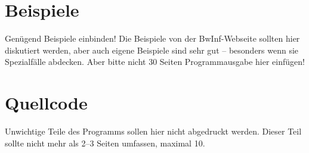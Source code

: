 \documentclass[a4paper,10pt,ngerman]{scrartcl}
\begin{document}
\section{Beispiele}
Genügend Beispiele einbinden! Die Beispiele von der BwInf-Webseite sollten hier diskutiert werden, aber auch eigene Beispiele sind sehr gut – besonders wenn sie Spezialfälle abdecken. Aber bitte nicht 30 Seiten Programmausgabe hier einfügen!

\section{Quellcode}
Unwichtige Teile des Programms sollen hier nicht abgedruckt werden. Dieser Teil sollte nicht mehr als 2–3 Seiten umfassen, maximal 10.
\end{document}
